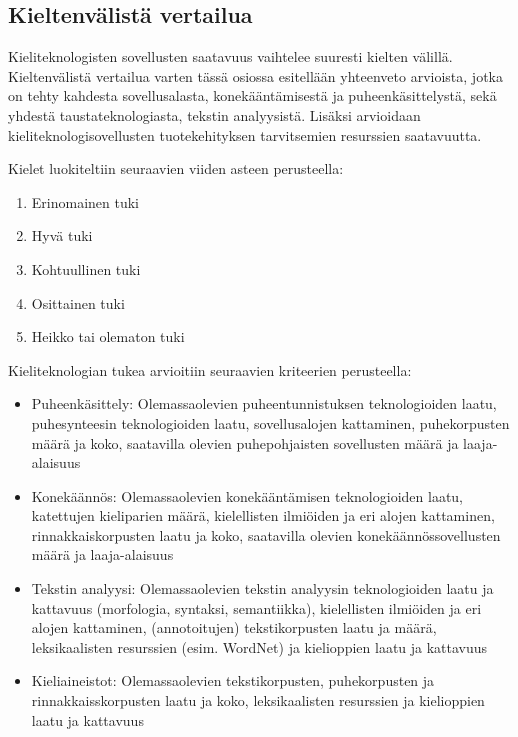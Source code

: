 \begin{multicols}{2}
\subsection{Kieltenvälistä vertailua}


Kieliteknologisten sovellusten saatavuus
vaihtelee suuresti kielten välillä.
Kieltenvälistä vertailua varten tässä osiossa
esitellään yhteenveto arvioista, jotka on tehty
kahdesta sovellusalasta,
konekääntämisestä ja puheenkäsittelystä, sekä
yhdestä taustateknologiasta, tekstin
analyysistä. Lisäksi arvioidaan
kieliteknologisovellusten tuotekehityksen
tarvitsemien resurssien saatavuutta.

Kielet luokiteltiin seuraavien viiden asteen perusteella:

\begin{enumerate}
\item Erinomainen tuki
\item Hyvä tuki
\item Kohtuullinen tuki
\item Osittainen tuki
\item Heikko tai olematon tuki
\end{enumerate}

Kieliteknologian tukea arvioitiin seuraavien kriteerien
perusteella:
\begin{itemize}
\item Puheenkäsittely: Olemassaolevien puheentunnistuksen teknologioiden
laatu, puhesynteesin teknologioiden laatu, sovellusalojen kattaminen,
puhekorpusten määrä ja koko, saatavilla olevien puhepohjaisten
sovellusten määrä ja laaja-alaisuus

\item Konekäännös: Olemassaolevien konekääntämisen teknologioiden
laatu, katettujen kieliparien määrä, kielellisten ilmiöiden ja
eri alojen kattaminen, rinnakkaiskorpusten laatu ja koko,
saatavilla olevien konekäännössovellusten määrä ja laaja-alaisuus

\item Tekstin analyysi: Olemassaolevien tekstin
analyysin teknologioiden laatu ja kattavuus (morfologia, syntaksi,
semantiikka), kielellisten ilmiöiden ja eri alojen kattaminen,
(annotoitujen) tekstikorpusten laatu ja määrä, leksikaalisten resurssien
(esim. WordNet) ja kielioppien laatu ja kattavuus

\item Kieliaineistot: Olemassaolevien tekstikorpusten, puhekorpusten ja
rinnakkaisskorpusten laatu ja koko, leksikaalisten resurssien ja
kielioppien laatu ja kattavuus
\end{itemize}


\end{multicols}
